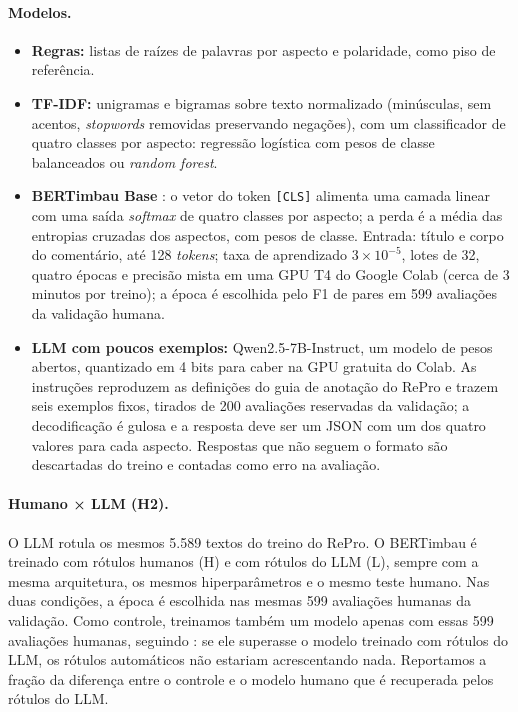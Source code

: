 \documentclass[12pt,a4paper]{article}
\begin{document}
\paragraph{Modelos.}
\begin{itemize}
  \item \textbf{Regras:} listas de raízes de palavras por aspecto e polaridade, como piso de referência.
  \item \textbf{TF-IDF:} unigramas e bigramas sobre texto normalizado (minúsculas, sem acentos, \emph{stopwords} removidas preservando negações), com um classificador de quatro classes por aspecto: regressão logística com pesos de classe balanceados ou \emph{random forest}.
  \item \textbf{BERTimbau Base} \citep{souza2020bertimbau}: o vetor do token \texttt{[CLS]} alimenta uma camada linear com uma saída \emph{softmax} de quatro classes por aspecto; a perda é a média das entropias cruzadas dos aspectos, com pesos de classe. Entrada: título e corpo do comentário, até 128 \emph{tokens}; taxa de aprendizado $3\times10^{-5}$, lotes de 32, quatro épocas e precisão mista em uma GPU T4 do Google Colab (cerca de 3 minutos por treino); a época é escolhida pelo F1 de pares em 599 avaliações da validação humana.
  \item \textbf{LLM com poucos exemplos:} Qwen2.5-7B-Instruct, um modelo de pesos abertos, quantizado em 4 bits para caber na GPU gratuita do Colab. As instruções reproduzem as definições do guia de anotação do RePro e trazem seis exemplos fixos, tirados de 200 avaliações reservadas da validação; a decodificação é gulosa e a resposta deve ser um JSON com um dos quatro valores para cada aspecto. Respostas que não seguem o formato são descartadas do treino e contadas como erro na avaliação.
\end{itemize}

\paragraph{Humano × LLM (H2).} O LLM rotula os mesmos 5.589 textos do treino do RePro. O BERTimbau é treinado com rótulos humanos (H) e com rótulos do LLM (L), sempre com a mesma arquitetura, os mesmos hiperparâmetros e o mesmo teste humano. Nas duas condições, a época é escolhida nas mesmas 599 avaliações humanas da validação. Como controle, treinamos também um modelo apenas com essas 599 avaliações humanas, seguindo \citet{zhu2023weaker}: se ele superasse o modelo treinado com rótulos do LLM, os rótulos automáticos não estariam acrescentando nada. Reportamos a fração da diferença entre o controle e o modelo humano que é recuperada pelos rótulos do LLM.
\end{document}
